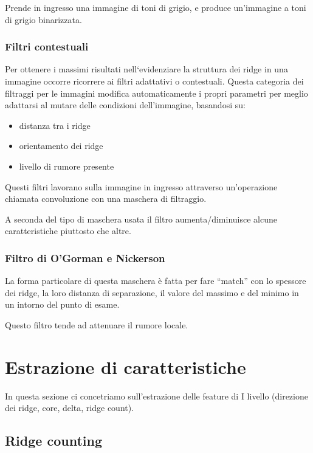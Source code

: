 \noindent Prende in ingresso una immagine di toni di grigio, e produce un'immagine 
a toni di grigio binarizzata.

\subsubsection{Filtri contestuali}

Per ottenere i massimi risultati nell‘evidenziare la
struttura dei ridge in una immagine occorre ricorrere ai
filtri adattativi o contestuali. Questa categoria dei filtraggi per le immagini modifica
automaticamente i propri parametri per meglio adattarsi
al mutare delle condizioni dell’immagine, basandosi su:
\begin{itemize}
    \item distanza tra i ridge
    \item orientamento dei ridge
    \item livello di rumore presente
\end{itemize}

\noindent Questi filtri lavorano sulla immagine in ingresso
attraverso un’operazione chiamata convoluzione con una
maschera di filtraggio.

\noindent A seconda del tipo di maschera usata il filtro
aumenta/diminuisce alcune caratteristiche piuttosto che
altre.

\subsubsection{Filtro di O'Gorman e Nickerson}

La forma particolare di questa maschera è fatta per fare
“match” con lo spessore dei ridge, la loro distanza di
separazione, il valore del massimo e del minimo in un
intorno del punto di esame.

\noindent Questo filtro tende ad attenuare il rumore locale.

\section{Estrazione di caratteristiche}

In questa sezione ci concetriamo sull'estrazione delle feature di I livello (direzione dei ridge, core, delta, ridge count).

\subsection{Ridge counting}

